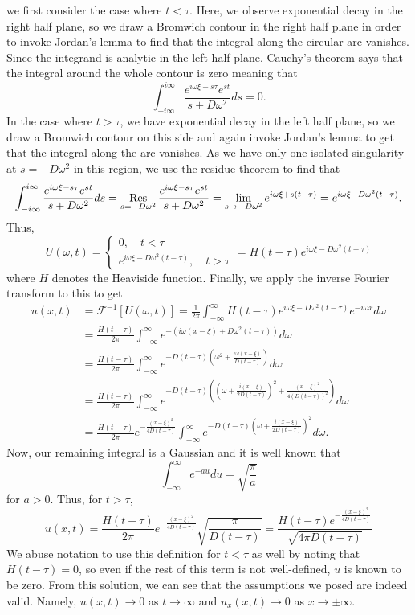 \documentclass{article}
\begin{document}
we first consider the case where $t<\tau$. Here, we observe exponential decay in the right half plane, so we draw a Bromwich contour in the right half plane in order to invoke Jordan's lemma to find that the integral along the circular arc vanishes. Since the integrand is analytic in the left half plane, Cauchy's theorem says that the integral around the whole contour is zero meaning that 
\[
\int_{-i\infty}^{i\infty}\frac{e^{i\omega\xi-s\tau}e^{st}}{s+D\omega^2}ds=0.
\]
In the case where $t>\tau$, we have exponential decay in the left half plane, so we draw a Bromwich contour on this side and again invoke Jordan's lemma to get that the integral along the arc vanishes. As we have only one isolated singularity at $s=-D\omega^2$ in this region, we use the residue theorem to find that 
\begin{align*}
\int_{-i\infty}^{i\infty}\frac{e^{i\omega\xi-s\tau}e^{st}}{s+D\omega^2}ds=\operatorname*{Res}_{s=-D\omega^2}\frac{e^{i\omega\xi-s\tau}e^{st}}{s+D\omega^2}=\lim_{s\to-D\omega^2}e^{i\omega\xi+s(t-\tau)}=e^{i\omega \xi-D\omega^2(t-\tau)}.
\end{align*}
Thus, 
\[
U(\omega,t)=\begin{cases}
	0,\quad t<\tau\\
	e^{i\omega \xi-D\omega^2(t-\tau)},\quad t>\tau
\end{cases}=H(t-\tau)e^{i\omega \xi-D\omega^2(t-\tau)}
\]
where $H$ denotes the Heaviside function. Finally, we apply the inverse Fourier transform to this to get 
\begin{align*}
u(x,t)&=\mathcal{F}^{-1}[U(\omega,t)]=\frac{1}{2\pi}\int_{-\infty}^{\infty}H(t-\tau)e^{i\omega \xi-D\omega^2(t-\tau)}e^{-i\omega x}d\omega\\&=
\frac{H(t-\tau)}{2\pi}\int_{-\infty}^{\infty}e^{-(i\omega (x-\xi)+D\omega^2(t-\tau))}d\omega\\&=
\frac{H(t-\tau)}{2\pi}\int_{-\infty}^{\infty}e^{-D(t-\tau)\left(\omega^2+\frac{i\omega(x-\xi)}{D(t-\tau)}\right)}d\omega\\&=
\frac{H(t-\tau)}{2\pi}\int_{-\infty}^{\infty}e^{-D(t-\tau)\left(\left(\omega+\frac{i(x-\xi)}{2D(t-\tau)}\right)^2+\frac{(x-\xi)^2}{4(D(t-\tau))^2}\right)}d\omega\\&=
\frac{H(t-\tau)}{2\pi}e^{-\frac{(x-\xi)^2}{4D(t-\tau)}}\int_{-\infty}^{\infty}e^{-D(t-\tau)\left(\omega+\frac{i(x-\xi)}{2D(t-\tau)}\right)^2}d\omega.
\end{align*}
Now, our remaining integral is a Gaussian and it is well known that
\[
\int_{-\infty}^{\infty}e^{-au}du=\sqrt{\frac{\pi}{a}}
\]
for $a>0$. Thus, for $t>\tau$,
\[
u(x,t)=\frac{H(t-\tau)}{2\pi}e^{-\frac{(x-\xi)^2}{4D(t-\tau)}}\sqrt{\frac{\pi}{D(t-\tau)}}=\frac{H(t-\tau)e^{-\frac{(x-\xi)^2}{4D(t-\tau)}}}{\sqrt{4\pi D(t-\tau)}}
\] 
We abuse notation to use this definition for $t<\tau$ as well by noting that $H(t-\tau)=0$, so even if the rest of this term is not well-defined, $u$ is known to be zero. From this solution, we can see that the assumptions we posed are indeed valid. Namely, $u(x,t)\to0$ as $t\to\infty$ and $u_x(x,t)\to0$ as $x\to\pm\infty$.
\end{document}
